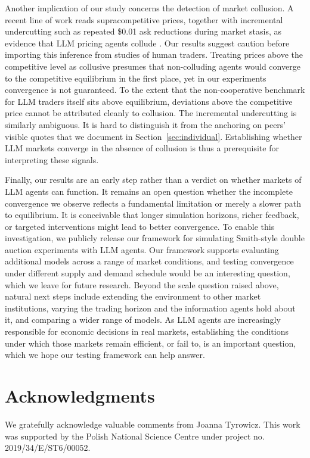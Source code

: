 \documentclass[letterpaper]{article} %
\begin{document}
Another implication of our study concerns the detection of market collusion. A recent line of work reads supracompetitive prices, together with incremental undercutting such as repeated \$0.01 ask reductions during market stasis, as evidence that LLM pricing agents collude \citep{agrawalEvaluatingLLMAgent2025}. Our results suggest caution before importing this inference from studies of human traders. Treating prices above the competitive level as collusive presumes that
non-colluding agents would converge to the competitive equilibrium in the first
place, yet in our experiments convergence is not guaranteed. To the extent that the non-cooperative benchmark for LLM traders itself sits above equilibrium, deviations above the competitive price cannot be attributed cleanly to collusion. The incremental undercutting is similarly ambiguous. It is hard to distinguish it from the anchoring on peers' visible quotes that we document in Section~\ref{sec:individual}. Establishing whether LLM markets converge in the absence of collusion is thus a prerequisite for interpreting these signals.

Finally, our results are an early step rather than a verdict on whether markets of LLM agents can function. It remains an open question whether the incomplete convergence we observe reflects a fundamental limitation or merely a slower path to equilibrium. It is conceivable that longer simulation horizons, richer feedback, or targeted interventions might lead to better convergence. To enable this investigation, we publicly release our framework for simulating Smith-style double auction experiments with LLM agents. Our framework supports evaluating additional models across a range of market conditions, and testing convergence under different supply and demand schedule would be an interesting question, which we leave for future research. Beyond the scale question raised above, natural next steps include extending the environment to other market institutions, varying the trading horizon and the information agents hold about it, and comparing a wider range of models. As LLM agents are increasingly responsible for economic decisions in real markets, establishing the conditions under which those markets remain efficient, or fail to, is an important question, which we hope our testing framework can help answer.

\section*{Acknowledgments}
We gratefully acknowledge valuable comments from Joanna Tyrowicz. This work was supported by the Polish National Science Centre under project no. 2019/34/E/ST6/00052.
\end{document}
